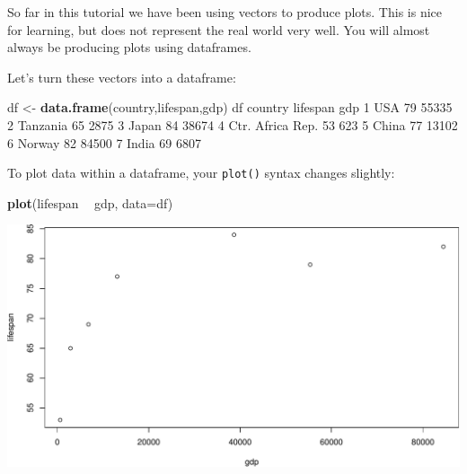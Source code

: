 \documentclass[
]{book}
\newenvironment{Shaded}{\begin{snugshade}}{\end{snugshade}}
\newcommand{\DataTypeTok}[1]{\textcolor[rgb]{0.13,0.29,0.53}{#1}}
\newcommand{\DecValTok}[1]{\textcolor[rgb]{0.00,0.00,0.81}{#1}}
\newcommand{\KeywordTok}[1]{\textcolor[rgb]{0.13,0.29,0.53}{\textbf{#1}}}
\newcommand{\NormalTok}[1]{#1}
\newcommand{\OperatorTok}[1]{\textcolor[rgb]{0.81,0.36,0.00}{\textbf{#1}}}
\newcommand{\StringTok}[1]{\textcolor[rgb]{0.31,0.60,0.02}{#1}}
\begin{document}
So far in this tutorial we have been using vectors to produce plots. This is nice for learning, but does not represent the real world very well. You will almost always be producing plots using dataframes.

Let's turn these vectors into a dataframe:

\begin{Shaded}
\begin{Highlighting}[]
\NormalTok{df <-}\StringTok{ }\KeywordTok{data.frame}\NormalTok{(country,lifespan,gdp)}
\NormalTok{df}
\NormalTok{           country lifespan   gdp}
\DecValTok{1}\NormalTok{              USA       }\DecValTok{79} \DecValTok{55335}
\DecValTok{2}\NormalTok{         Tanzania       }\DecValTok{65}  \DecValTok{2875}
\DecValTok{3}\NormalTok{            Japan       }\DecValTok{84} \DecValTok{38674}
\DecValTok{4}\NormalTok{ Ctr. Africa Rep.       }\DecValTok{53}   \DecValTok{623}
\DecValTok{5}\NormalTok{            China       }\DecValTok{77} \DecValTok{13102}
\DecValTok{6}\NormalTok{           Norway       }\DecValTok{82} \DecValTok{84500}
\DecValTok{7}\NormalTok{            India       }\DecValTok{69}  \DecValTok{6807}
\end{Highlighting}
\end{Shaded}

To plot data within a dataframe, your \texttt{plot()} syntax changes slightly:

\begin{Shaded}
\begin{Highlighting}[]
\KeywordTok{plot}\NormalTok{(lifespan }\OperatorTok{~}\StringTok{ }\NormalTok{gdp, }\DataTypeTok{data=}\NormalTok{df)}
\end{Highlighting}
\end{Shaded}

\includegraphics{figures/unnamed-chunk-240-1.pdf}
\end{document}
